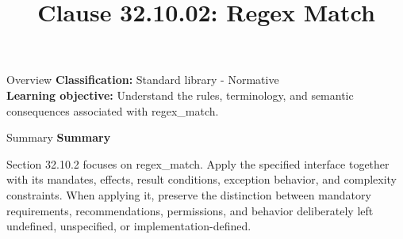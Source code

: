 \documentclass[10pt,letterpaper]{article}
\title{Clause 32.10.02: Regex Match}
\author{}
\date{}
\begin{document}
\maketitle
\begin{CornellOverviewBox}{Overview}
\textbf{Classification:} Standard library - Normative\\[2pt]
\textbf{Learning objective:} Understand the rules, terminology, and semantic consequences associated with regex\_match.
\end{CornellOverviewBox}\begin{CornellSummaryBox}{Summary}
{\sffamily\bfseries\color{Accent} Summary}\par\vspace{3pt}Section 32.10.2 focuses on regex\_match. Apply the specified interface together with its mandates, effects, result conditions, exception behavior, and complexity constraints. When applying it, preserve the distinction between mandatory requirements, recommendations, permissions, and behavior deliberately left undefined, unspecified, or implementation-defined.
\end{CornellSummaryBox}
\end{document}
